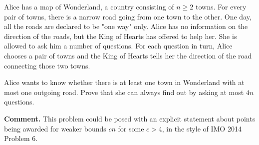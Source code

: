 Alice has a map of Wonderland, a country consisting of $n \geq 2$ towns. For every pair of towns, there is a narrow road going from one town to the other. One day, all the roads are declared to be "one way" only. Alice has no information on the direction of the roads, but the King of Hearts has offered to help her. She is allowed to ask him a number of questions. For each question in turn, Alice chooses a pair of towns and the King of Hearts tells her the direction of the road connecting those two towns.

Alice wants to know whether there is at least one town in Wonderland with at most one outgoing road. Prove that she can always find out by asking at most $4n$ questions.

\textbf{Comment.} This problem could be posed with an explicit statement about points being awarded for weaker bounds $cn$ for some $c > 4$, in the style of IMO 2014 Problem 6.
